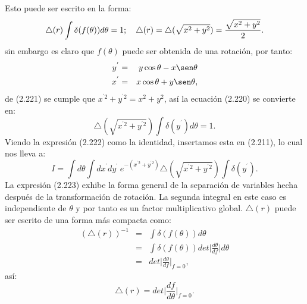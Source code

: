 Esto puede ser escrito en la forma:
\begin{equation}
\triangle(r)\int\delta(f(\theta))d\theta=1;\ \ \ \triangle(r)=\text{\ensuremath{\triangle}}(\sqrt{x^{2}+y^{2}})=\frac{\sqrt{x^{2}+y^{2}}}{2}.
\end{equation}
sin embargo es claro que $f(\theta)$ puede ser obtenida de una rotación, por tanto:
\begin{eqnarray}
\nonumber y^{^{\prime}}&=&y\cos \theta -x\sen \theta\\
x^{^{\prime}}&=&x\cos \theta +y\sen \theta ,
\end{eqnarray}
de (2.221) se cumple que $x^{^{\prime} 2}+y^{^{\prime} 2}=x^2+y^2$, así la ecuación (2.220) se convierte en:
\begin{equation}
\triangle(\sqrt{x^{^{\prime}2}+y^{^{\prime}2}})\int\delta(y^{^{\prime}})d\theta=1.
\end{equation}
Viendo la expresión (2.222) como la identidad, insertamos esta en (2.211), lo cual nos lleva a:
\begin{equation}
I=\int d\theta \int dx^{^{\prime}}dy^{^{\prime}}\ e^{-(x^{^{\prime} 2}+y^{^{\prime} 2})}\triangle(\sqrt{x^{^{\prime}2}+y^{^{\prime}2}})\int\delta(y^{^{\prime}}).
\end{equation}
La expresión (2.223) exhibe la forma general de la separación de variables hecha después de la transformación de rotación. La segunda integral en este caso es independiente de $\theta$ y por tanto es un factor multiplicativo global. $\triangle (r)$ puede ser escrito de una forma más compacta como:
\begin{eqnarray}
\nonumber (\triangle (r))^{-1}&=&\int \delta(f(\theta))d\theta \\
\nonumber &=& \int \delta(f(\theta))det\bigg|\frac{d\theta}{df}\bigg| d\theta\\
&=&det\bigg|\frac{d\theta}{df}\bigg|_{f=0},
\end{eqnarray}
así:
\begin{equation}
\triangle (r)=det\bigg|\frac{df}{d\theta}\bigg|_{f=0}.
\end{equation}
